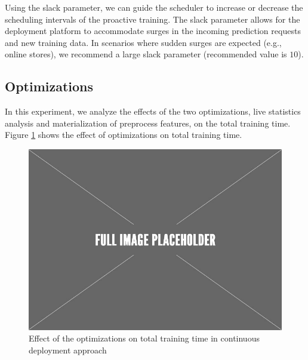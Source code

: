 Using the slack parameter, we can guide the scheduler to increase or decrease the scheduling intervals of the proactive training.
The slack parameter allows for the deployment platform to accommodate surges in the incoming prediction requests and new training data.
In scenarios where sudden surges are expected (e.g., online stores), we recommend a large slack parameter (recommended value is $10$). 

\subsection{Optimizations}
In this experiment, we analyze the effects of the two optimizations, live statistics analysis and materialization of preprocess features, on the total training time.
Figure \ref{optimization-effect} shows the effect of optimizations on total training time.
\begin{figure}
\centering
\includegraphics[width=\columnwidth]{../images/placeholder.jpeg}
\caption{Effect of the optimizations on total training time in continuous deployment approach}
\label{optimization-effect}
\end{figure}

